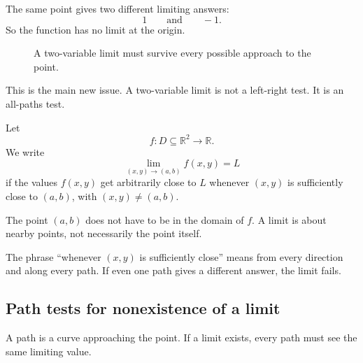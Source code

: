 The same point gives two different limiting answers:
\[
    1
    \qquad\text{and}\qquad
    -1.
\]
So the function has no limit at the origin.

\begin{figure}[h]
\centering
{}
\caption{A two-variable limit must survive every possible approach to the point.}
\end{figure}

This is the main new issue.  A two-variable limit is not a left-right test.  It is an
all-paths test.

\begin{definition}
Let
\[
    f:D\subseteq\mathbb R^2\to\mathbb R.
\]
We write
\[
\boxed{
    \lim_{(x,y)\to(a,b)} f(x,y)=L
}
\]
if the values \(f(x,y)\) get arbitrarily close to \(L\) whenever \((x,y)\) is sufficiently
close to \((a,b)\), with \((x,y)\ne(a,b)\).

The point \((a,b)\) does not have to be in the domain of \(f\).  A limit is about nearby
points, not necessarily the point itself.
\end{definition}

The phrase ``whenever \((x,y)\) is sufficiently close'' means from every direction and
along every path.  If even one path gives a different answer, the limit fails.

\subsection{Path tests for nonexistence of a limit}

A path is a curve approaching the point.  If a limit exists, every path must see the same
limiting value.

